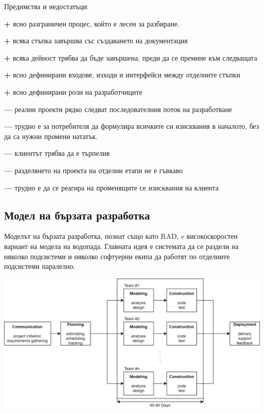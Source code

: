 \documentclass[fleqn,12pt]{article}
\begin{document}
Предимства и недостатъци:
\begin{description}
	\item \textbf{+} ясно разграничен процес, който е лесен за разбиране.
	\item \textbf{+} всяка стъпка завършва със създаването на документация
	\item \textbf{+} всяка дейност трябва да бъде завършена, преди да се премине към следващата
	\item \textbf{+} ясно дефинирани входове, изходи и интерфейси между отделните стъпки
	\item \textbf{+} ясно дефинирани роли на разработчиците
	\item \textbf{---} реални проекти рядко следват последователния поток на разработване
	\item \textbf{---} трудно е за потребителя да формулира всичките си изисквания в началото, без да са нужни промени нататък.
	\item \textbf{---} клиентът трябва да е търпелив
	\item \textbf{---} разделянето на проекта на отделни етапи не е гъвкаво
	\item \textbf{---} трудно е да се реагира на променящите се изисквания на клиента
\end{description}

\subsection{Модел на бързата разработка}
Моделът на бързата разработка, познат също като RAD, e високоскоростен вариант на модела на водопада. Главната идея е системата да се раздели на няколко подсистеми и няколко софтуерни екипа да работят по отделните подсистеми паралелно.

\leavevmode \newline
\includegraphics[width=\textwidth]{RAD}
\leavevmode \newline
\end{document}
